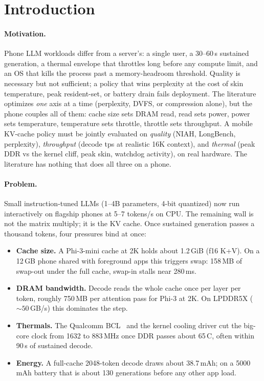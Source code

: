 \documentclass[sigconf, anonymous=false, screen=true]{acmart}
\begin{document}

\maketitle

\section{Introduction}
\label{sec:intro}

\paragraph{Motivation.} Phone LLM workloads differ from a server's: a single user, a 30--60\,s sustained generation, a thermal envelope that throttles long before any compute limit, and an OS that kills the process past a memory-headroom threshold. Quality is necessary but not sufficient; a policy that wins perplexity at the cost of skin temperature, peak resident-set, or battery drain fails deployment. The literature optimizes \emph{one} axis at a time (perplexity, DVFS, or compression alone), but the phone couples all of them: cache size sets DRAM read, read sets power, power sets temperature, temperature sets throttle, throttle sets throughput. A mobile KV-cache policy must be jointly evaluated on \emph{quality} (NIAH, LongBench, perplexity), \emph{throughput} (decode tps at realistic 16K context), and \emph{thermal} (peak DDR vs the kernel cliff, peak skin, watchdog activity), on real hardware. The literature has nothing that does all three on a phone.

\paragraph{Problem.} Small instruction-tuned LLMs (1--4B parameters, 4-bit quantized) now run interactively on flagship phones at 5--7 tokens/s on CPU. The remaining wall is not the matrix multiply; it is the KV cache. Once sustained generation passes a thousand tokens, four pressures bind at once:

\begin{itemize}
\item \textbf{Cache size.} A Phi-3-mini cache at 2K holds about 1.2\,GiB (f16 K+V). On a 12\,GB phone shared with foreground apps this triggers swap: 158\,MB of swap-out under the full cache, swap-in stalls near 280\,ms.
\item \textbf{DRAM bandwidth.} Decode reads the whole cache once per layer per token, roughly 750\,MB per attention pass for Phi-3 at 2K. On LPDDR5X (${\sim}50$\,GB/s) this dominates the step.
\item \textbf{Thermals.} The Qualcomm BCL~\cite{qualcommbcl} and the kernel cooling driver cut the big-core clock from 1632 to 883\,MHz once DDR passes about 65\,\textdegree C, often within 90\,s of sustained decode.
\item \textbf{Energy.} A full-cache 2048-token decode draws about 38.7\,mAh; on a 5000\,mAh battery that is about 130 generations before any other app load.
\end{itemize}
\end{document}

